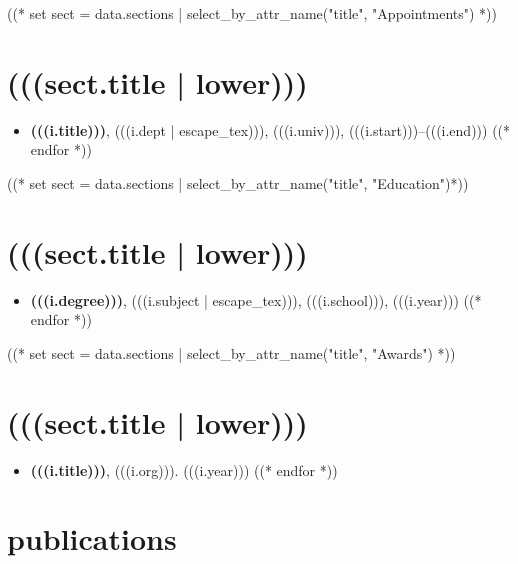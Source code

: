\documentclass[11pt,article,oneside]{memoir}
\begin{document}
((* set sect = data.sections | select_by_attr_name("title", "Appointments") *))
\section{(((sect.title | lower)))}

\mbox{}\vspace{-\dimexpr\baselineskip\relax}

\begin{itemize}[label={}]
  ((* for i in sect.entries.appointments | sort_by_attr(["start"], reverse=True) *))
  \item \textbf{(((i.title)))}, (((i.dept | escape_tex))), (((i.univ))), (((i.start)))--(((i.end)))
        ((* endfor *))
\end{itemize}

((* set sect = data.sections | select_by_attr_name("title", "Education")*))
\section{(((sect.title | lower)))}

\mbox{}\vspace{-\dimexpr\baselineskip\relax}

\begin{itemize}[label={}]
  ((* for i in sect.entries.degrees | sort_by_attr(["year"], reverse=True) *))
  \item \textbf{(((i.degree)))}, (((i.subject | escape_tex))), (((i.school))), (((i.year)))
        ((* endfor *))
\end{itemize}

((* set sect = data.sections | select_by_attr_name("title", "Awards") *))
\section{(((sect.title | lower)))}

\mbox{}\vspace{-\dimexpr\baselineskip\relax}

\begin{itemize}[label={}]
  ((* for i in sect.entries.awards | sort_by_attr(["year"], reverse=True) *))
  \item \textbf{(((i.title)))}, (((i.org))). (((i.year)))
        ((* endfor *))
\end{itemize}

\section{publications}
\end{document}
